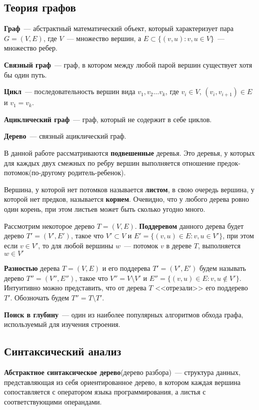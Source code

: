 \subsection{Теория графов}

\textbf{Граф}~--- абстрактный математический объект, который характеризует 
пара $G = (V, E)$, где $V$~--- множество вершин, а $E \subset \{(v, u): v, u \in V\}$~--- множество ребер. 

\textbf{Связный граф}~--- граф, в котором между любой парой вершин существует хотя бы один путь.

\textbf{Цикл}~--- последовательность вершин вида $v_1, v_2 \dots v_k$, где $v_i \in V$, 
$(v_i, v_{i+1}) \in E$ и $v_1 = v_k$.

\textbf{Ациклический граф}~--- граф, который не содержит в себе циклов.

\textbf{Дерево}~--- связный ациклический граф.

В данной работе рассматриваются \textbf{подвешенные} деревья. Это деревья, у которых для каждых двух смежных по ребру
вершин выполняется отношение предок-потомок(по-другому родитель-ребенок).

Вершина, у которой нет потомков называется \textbf{листом}, в свою очередь вершина, у которой нет предков,
называется \textbf{корнем}. Очевидно, что у любого дерева ровно один корень, при этом листьев может быть сколько угодно много.

Рассмотрим некоторое дерево $T = (V, E)$. \textbf{Поддеревом} данного дерева будет дерево $T' = (V', E')$, такое что
$V' \subset V$ и $E' = \{(v, u) \in E : v, u \in V'\}$, при этом если $v \in V'$, то для любой
вершины $w$~--- потомок $v$ в дереве $T$, выполняется $w \in V'$

\textbf{Разностью} дерева $T = (V, E)$ и его поддерева $T' = (V', E')$ будем называть дерево $T'' = (V'', E'')$,
такое что $V'' = V \setminus V'$ и $E'' = \{(v, u) \in E : v, u \notin V'\}$. Интуитивно можно представить, что от дерева
$T$ <<отрезали>> его поддерево $T'$. Обозночать будем $T'' = T \setminus T'$.


\textbf{Поиск в глубину}~--- один из наиболее популярных алгоритмов обхода графа, используемый для изучения строения. 

\subsection{Синтаксический анализ}

\textbf{Абстрактное синтаксическое дерево}(дерево разбора)~--- структура данных, представляющая из себя ориентированное дерево, 
в котором каждая вершина сопоставляется с оператором языка программирования, а листья с соответствующими операндами. 


